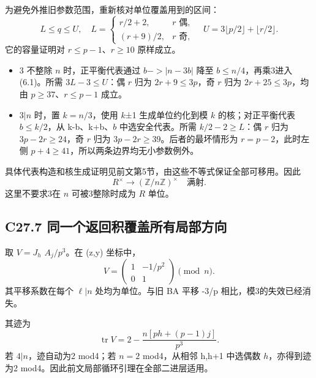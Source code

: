 {为避免外推旧参数范围，重新核对单位覆盖用到的区间：} \[
L\le q\le U,\quad
L=\begin{cases}r/2+2,&r\text{ 偶},\\(r+9)/2,&r\text{ 奇},\end{cases}
\quad U=3\lfloor p/2\rfloor+\lfloor r/2\rfloor.
\tag{C27.6.1}
\] {它的容量证明对} {\ensuremath{r\le p-1}、\ensuremath{r\ge 10}} {原样成立。}

\begin{itemize}
\tightlist
\item
  {3} {不整除} {\ensuremath{n}} {时，正平衡代表通过} {\ensuremath{b->|n-3b|}} {降至} {\ensuremath{b\le n/4}，再乘3进入} {(6.1)。所需} {\ensuremath{3L-3\le U}：偶} {\ensuremath{r}} {归为} {\ensuremath{2r+9\le 3p}，奇} {\ensuremath{r}} {归为} {\ensuremath{2r+25\le 3p}，均由} {\ensuremath{p\ge 37}、\ensuremath{r\le p-1}} {成立。}
\item
  {\ensuremath{3|n}} {时，置} {\ensuremath{k=n/3}，使用} {\ensuremath{k}±1} {生成单位约化到模} {\ensuremath{k}} {的核；对正平衡代表} {\ensuremath{b\le k/2}，从} {k-b、k+b、\ensuremath{b}} {中选安全代表。所需} {\ensuremath{k/2-2\ge L}：偶} {\ensuremath{r}} {归为} {\ensuremath{3p-2r\ge 24}，奇} {\ensuremath{r}} {归为} {\ensuremath{3p-2r\ge 39}。后者的最坏情形为} {\ensuremath{r=p-2}，此时左侧} {\ensuremath{p+4\ge 41}，所以两条边界均无小参数例外。}
\end{itemize}

{具体代表构造和核生成证明见前文第5节，由这些不等式保证全部可移用。因此} \[
R^\times\longrightarrow(\mathbb Z/n\mathbb Z)^\times
\quad\text{满射}.
\tag{C27.6.2}
\] {这里不要求3在} {\ensuremath{n}} {可被3整除时成为} {\ensuremath{R}} {单位。}

\subsection*{\texorpdfstring{{C27.7} {同一个返回积覆盖所有局部方向}}{C27.7 同一个返回积覆盖所有局部方向}}\label{C27-h174}

{取} {\ensuremath{V=J_{h}}} {\ensuremath{A_{j}/p^{3}}。在} {(z,y)} {坐标中，} \[
\boxed{V=\begin{pmatrix}1&-1/p^2\\0&1\end{pmatrix}\pmod n.}
\tag{C27.7.1}
\] {其平移系数在每个} {\ensuremath{\ell |n}} {处均为单位。与旧} {BA} {平移} {-3/p} {相比，模3的失效已经消失。}

{其迹为} \[
\operatorname{tr}V=
2-\frac{n[ph+(p-1)j]}{p^3}.
\tag{C27.7.2}
\] {若} {\ensuremath{4|n}，迹自动为2} {mod4；若} {\ensuremath{n=2}} {mod4，从相邻} {h,h+1} {中选偶数} {\ensuremath{h}，亦得到迹为2} {mod4。因此前文局部循环引理在全部二进层适用。}

